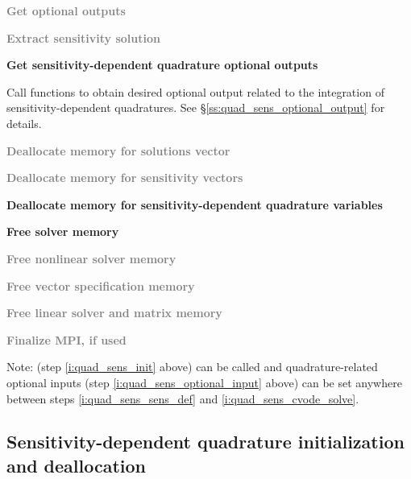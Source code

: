 \begin{Steps}
\item
  \textcolor{gray}{\bf Get optional outputs}

\item
  \textcolor{gray}{\bf Extract sensitivity solution}

\item
  {\bf Get sensitivity-dependent quadrature optional outputs}

  Call  functions to obtain desired optional output related
  to the integration of sensitivity-dependent quadratures.
  See \S\ref{ss:quad_sens_optional_output} for details.

\item
  \textcolor{gray}{\bf Deallocate memory for solutions vector}

\item 
  \textcolor{gray}{\bf Deallocate memory for sensitivity vectors}

\item
  {\bf Deallocate memory for sensitivity-dependent quadrature variables}

\item
  {\bf Free solver memory}
  
\item
  \textcolor{gray}{\bf Free nonlinear solver memory}

\item
  \textcolor{gray}{\bf Free vector specification memory}

\item
  \textcolor{gray}{\bf Free linear solver and matrix memory}

\item 
  \textcolor{gray}{\bf Finalize MPI, if used}
  
\end{Steps}
Note:  (step \ref{i:quad_sens_init} above) can
be called and quadrature-related optional inputs (step
\ref{i:quad_sens_optional_input} above) can be set anywhere between
steps \ref{i:quad_sens_sens_def} and \ref{i:quad_sens_cvode_solve}.


\subsection{Sensitivity-dependent quadrature initialization and deallocation}%
\label{ss:quad_sens_init}

